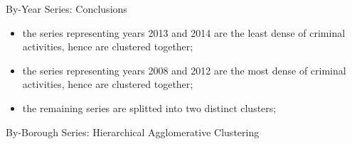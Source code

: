 \documentclass[12pt]{beamer}
\begin{document}
        \begin{frame}{By-Year Series: Conclusions}
            \begin{itemize}
                \item the series representing years 2013 and 2014 are the least dense of criminal
                activities, hence are clustered together;
                \item the series representing years 2008 and 2012 are the most dense of criminal activities,
                hence are clustered together;
                \item the remaining series are splitted into two distinct clusters;
            \end{itemize}
        \end{frame}

        \begin{frame}{By-Borough Series: Hierarchical Agglomerative Clustering}
            \begin{figure}
                \centering
            \end{figure}
        \end{frame}
\end{document}
